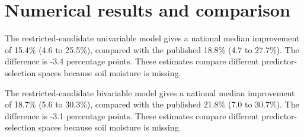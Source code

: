 \documentclass[11pt]{article}
\begin{document}
\section{Numerical results and comparison}
The restricted-candidate univariable model gives a national median improvement of 15.4\% (4.6 to 25.5\%), compared with the published 18.8\% (4.7 to 27.7\%). The difference is -3.4 percentage points. These estimates compare different predictor-selection spaces because soil moisture is missing.

The restricted-candidate bivariable model gives a national median improvement of 18.7\% (5.6 to 30.3\%), compared with the published 21.8\% (7.0 to 30.7\%). The difference is -3.1 percentage points. These estimates compare different predictor-selection spaces because soil moisture is missing.
\end{document}
